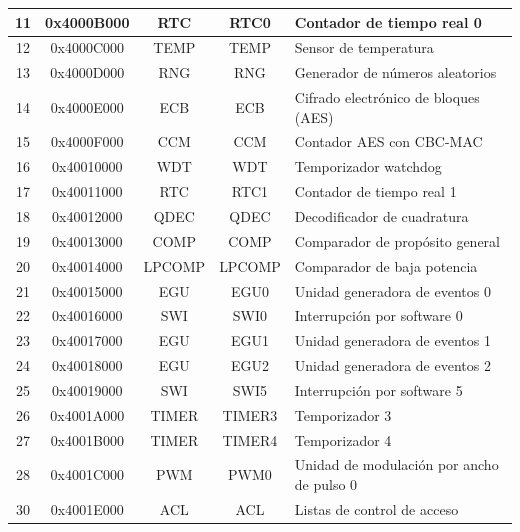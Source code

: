 \documentclass[12pt,a4paper]{article}
\begin{document}
\begin{table}[h!]
{\begin{tabularx}{\textwidth}{|c|c|c|c|X|}
11 & 0x4000B000 & RTC & RTC0 & Contador de tiempo real 0 \\ \hline
12 & 0x4000C000 & TEMP & TEMP & Sensor de temperatura \\ \hline
13 & 0x4000D000 & RNG & RNG & Generador de números aleatorios \\ \hline
14 & 0x4000E000 & ECB & ECB & Cifrado electrónico de bloques (AES) \\ \hline
15 & 0x4000F000 & CCM & CCM & Contador AES con CBC-MAC \\ \hline
16 & 0x40010000 & WDT & WDT & Temporizador watchdog \\ \hline
17 & 0x40011000 & RTC & RTC1 & Contador de tiempo real 1 \\ \hline
18 & 0x40012000 & QDEC & QDEC & Decodificador de cuadratura \\ \hline
19 & 0x40013000 & COMP & COMP & Comparador de propósito general \\ \hline
20 & 0x40014000 & LPCOMP & LPCOMP & Comparador de baja potencia \\ \hline
21 & 0x40015000 & EGU & EGU0 & Unidad generadora de eventos 0 \\ \hline
22 & 0x40016000 & SWI & SWI0 & Interrupción por software 0 \\ \hline
23 & 0x40017000 & EGU & EGU1 & Unidad generadora de eventos 1 \\ \hline
24 & 0x40018000 & EGU & EGU2 & Unidad generadora de eventos 2 \\ \hline
25 & 0x40019000 & SWI & SWI5 & Interrupción por software 5 \\ \hline
26 & 0x4001A000 & TIMER & TIMER3 & Temporizador 3 \\ \hline
27 & 0x4001B000 & TIMER & TIMER4 & Temporizador 4 \\ \hline
28 & 0x4001C000 & PWM & PWM0 & Unidad de modulación por ancho de pulso 0 \\ \hline
30 & 0x4001E000 & ACL & ACL & Listas de control de acceso \\ \hline
\end{tabularx}
}
\label{tab:perifericos}
\end{table}
\end{document}
